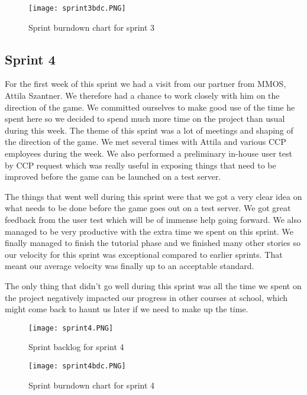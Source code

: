 \begin{figure}[H]
	\centering
	\graphicspath{ {./graphics/} }
    \centerline{\texttt{[image: sprint3bdc.PNG]}}
    \caption{\label{fig:s3bd}Sprint burndown chart for sprint 3}
\end{figure}

\subsection{Sprint 4}
For the first week of this sprint we had a visit from our partner from MMOS, Attila Szantner. We therefore had a chance to work closely with him on the direction of the game. We committed ourselves to make good use of the time he spent here so we decided to spend much more time on the project than usual during this week. The theme of this sprint was a lot of meetings and shaping of the direction of the game. We met several times with Attila and various CCP employees during the week. We also performed a preliminary in-house user test by CCP request which was really useful in exposing things that need to be improved before the game can be launched on a test server.

The things that went well during this sprint were that we got a very clear idea on what needs to be done before the game goes out on a test server. We got great feedback from the user test which will be of immense help going forward. We also managed to be very productive with the extra time we spent on this sprint. We finally managed to finish the tutorial phase and we finished many other stories so our velocity for this sprint was exceptional compared to earlier sprints. That meant our average velocity was finally up to an acceptable standard.

The only thing that didn't go well during this sprint was all the time we spent on the project negatively impacted our progress in other courses at school, which might come back to haunt us later if we need to make up the time.

\begin{landscape}

\begin{figure}[H]
	\centering
	\graphicspath{ {./graphics/} }
    \centerline{\texttt{[image: sprint4.PNG]}}
    \caption{\label{fig:s4}Sprint backlog for sprint 4}
\end{figure}

\end{landscape}

\begin{figure}[H]
	\centering
	\graphicspath{ {./graphics/} }
    \centerline{\texttt{[image: sprint4bdc.PNG]}}
    \caption{\label{fig:s4bd}Sprint burndown chart for sprint 4}
\end{figure}

